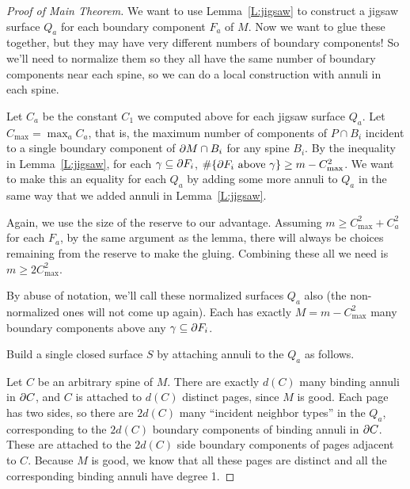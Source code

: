 \begin{proof}[Proof of Main Theorem]

We want to use Lemma~\ref{L:jigsaw} to construct a jigsaw surface
$Q_a$ for each boundary component $F_a$ of $M$. Now we want to glue these
together, but they may have very different numbers of boundary components! So
we'll need to normalize them so they all have the same number of boundary
components near each spine, so we can do a local construction with annuli in
each spine.

Let $C_a$ be the constant $C_1$ we computed above for each jigsaw surface
$Q_a$.  Let $C_{\mathrm{max}} = \operatorname{max}_a C_a$, that is, the maximum
number of components of $P \cap B_i$ incident to a single boundary component of
$\partial M \cap B_i$ for any spine $B_i$. By the inequality in
Lemma~\ref{L:jigsaw}, for each $\gamma \subseteq \partial F_i$, $\#\{\partial F_i \text{ above
} \gamma\} \geq m - C_{\mathrm{max}}^2$. We want to make this an equality for
each $Q_a$ by adding some more annuli to $Q_a$ in the same way that we added
annuli in Lemma~\ref{L:jigsaw}.

Again, we use the size of the reserve to our advantage. Assuming $m\geq
C_{\mathrm{max}}^2 + C_a^2$ for each $F_a$, by the same argument as the lemma,
there will always be choices remaining from the reserve to make the gluing.
Combining these all we need is $m\geq 2C_{\mathrm{max}}^2$.

By abuse of notation, we'll call these normalized surfaces $Q_a$ also (the
non-normalized ones will not come up again). Each has exactly $M
= m - C_{\mathrm{max}}^2$ many boundary components above any $\gamma \subseteq \partial
F_i$.

Build a single closed surface $S$ by attaching annuli to the $Q_a$ as follows.

Let $C$ be an arbitrary spine of $M$. There are exactly $d(C)$ many binding
annuli in $\partial C$, and $C$ is attached to $d(C)$ distinct pages, since $M$ is
good. Each page has two sides, so there are $2d(C)$ many ``incident neighbor
types'' in the $Q_a$, corresponding to the $2d(C)$ boundary components of
binding annuli in $\partial C$. These are attached to the $2d(C)$ side boundary
components of pages adjacent to $C$.  Because $M$ is good, we know that all
these pages are distinct and all the corresponding binding annuli have degree
1.


\end{proof}
